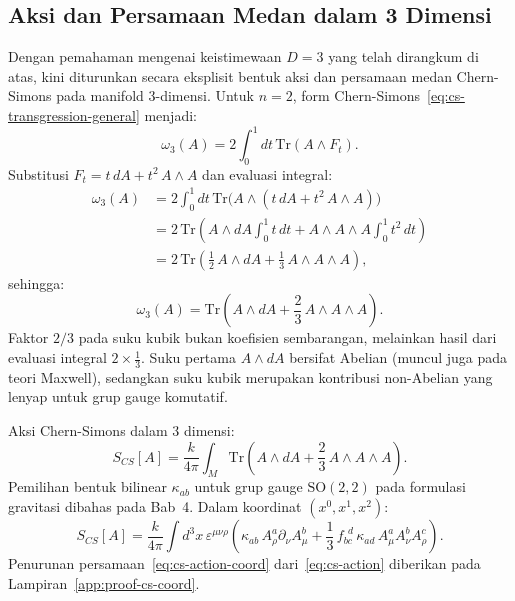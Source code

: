 \subsection{Aksi dan Persamaan Medan dalam 3 Dimensi}
\label{subsec:cs-3d}

Dengan pemahaman mengenai keistimewaan $D = 3$ yang telah dirangkum di atas, kini diturunkan secara eksplisit bentuk aksi dan persamaan medan Chern-Simons pada manifold 3-dimensi. Untuk $n = 2$, form Chern-Simons~\eqref{eq:cs-transgression-general} menjadi:
\begin{equation}
    \omega_3(A) = 2\int_0^1 dt\, \mathrm{Tr}(A \wedge F_t).
\end{equation}
Substitusi $F_t = t\,dA + t^2\, A \wedge A$ dan evaluasi integral:
\begin{align}
    \omega_3(A) &= 2\int_0^1 dt\, \mathrm{Tr}\!\big(A \wedge (t\,dA + t^2\, A \wedge A)\big) \nonumber\\
    &= 2\,\mathrm{Tr}\!\left(A \wedge dA \int_0^1 t\, dt + A \wedge A \wedge A \int_0^1 t^2\, dt\right) \nonumber\\
    &= 2\,\mathrm{Tr}\!\left(\frac{1}{2}\, A \wedge dA + \frac{1}{3}\, A \wedge A \wedge A\right),
\end{align}
sehingga:
\begin{equation}\label{eq:cs-form}
    \omega_3(A) = \mathrm{Tr}\!\left(A \wedge dA + \frac{2}{3}\, A \wedge A \wedge A\right).
\end{equation}
Faktor $2/3$ pada suku kubik bukan koefisien sembarangan, melainkan hasil dari evaluasi integral $2 \times \frac{1}{3}$. Suku pertama $A \wedge dA$ bersifat Abelian (muncul juga pada teori Maxwell), sedangkan suku kubik merupakan kontribusi non-Abelian yang lenyap untuk grup gauge komutatif.

Aksi Chern-Simons dalam 3 dimensi:
\begin{equation}\label{eq:cs-action}
    S_{CS}[A] = \frac{k}{4\pi}\int_M \mathrm{Tr}\!\left(A \wedge dA + \frac{2}{3}\, A \wedge A \wedge A\right).
\end{equation}
Pemilihan bentuk bilinear $\kappa_{ab}$ untuk grup gauge $\mathrm{SO}(2,2)$ pada formulasi gravitasi dibahas pada Bab~4. Dalam koordinat $(x^0, x^1, x^2)$:
\begin{equation}\label{eq:cs-action-coord}
    S_{CS}[A] = \frac{k}{4\pi}\int d^3x\, \varepsilon^{\mu\nu\rho}\left(\kappa_{ab}\, A_\rho^a \partial_\nu A_\mu^b + \frac{1}{3}\, f_{bc}^{\ \ d}\, \kappa_{ad}\, A_\mu^a A_\nu^b A_\rho^c\right).
\end{equation}
Penurunan persamaan~\eqref{eq:cs-action-coord} dari~\eqref{eq:cs-action} diberikan pada Lampiran~\ref{app:proof-cs-coord}.


